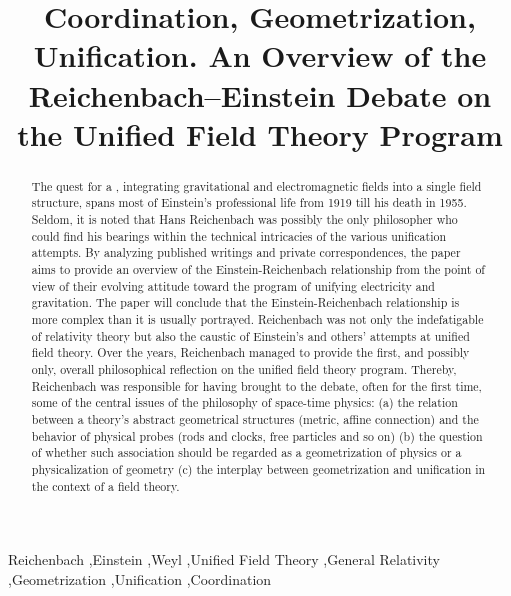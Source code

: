 \documentclass[draft]{article}
\title{Coordination, Geometrization, Unification. An Overview of the Reichenbach--Einstein Debate on the Unified Field Theory Program}
\begin{document}
\maketitle

\begin{abstract}
The quest for a , integrating gravitational and electromagnetic fields into a single field structure, spans most of Einstein's professional life from 1919 till his death in 1955. Seldom, it is noted that Hans Reichenbach was possibly the only philosopher who could find his bearings within the technical intricacies of the various unification attempts. By analyzing published writings and private correspondences, the paper aims to provide an overview of the Einstein-Reichenbach relationship from the point of view of their evolving attitude toward the program of unifying electricity and gravitation. The paper will conclude that the Einstein-Reichenbach relationship is more complex than it is usually portrayed. Reichenbach was not only the indefatigable  of relativity theory but also the caustic  of Einstein's and others' attempts at unified field theory. Over the years, Reichenbach managed to provide the first, and possibly only, overall philosophical reflection on the unified field theory program. Thereby, Reichenbach was responsible for having brought to the debate, often for the first time, some of the central issues of the philosophy of space-time physics: (a) the relation between a theory's abstract geometrical structures (metric, affine connection) and the behavior of physical probes (rods and clocks, free particles and so on) (b) the question of whether such association should be regarded as a geometrization of physics or a physicalization of geometry (c) the interplay between geometrization and unification in the context of a field theory.
\end{abstract}


\begin{keywords}
Reichenbach \sep Einstein \sep Weyl \sep Unified Field Theory \sep General Relativity \sep Geometrization \sep Unification \sep Coordination	
\end{keywords}
\end{document}
